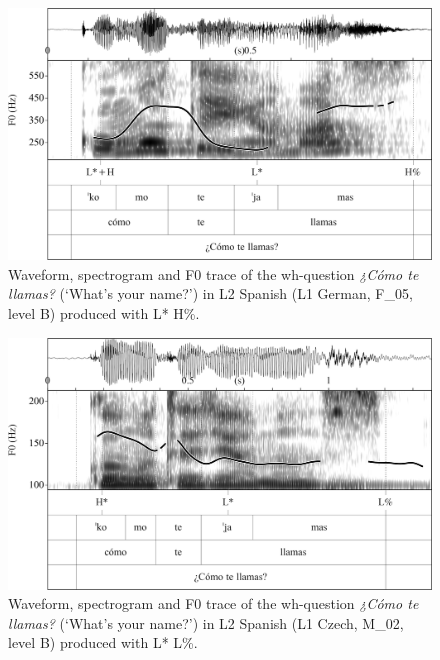 \begin{figure}


\includegraphics[width=\textwidth]{figures/Figure_4.113.png}



\caption{Waveform, spectrogram and F0 trace of the wh-question \textit{¿Cómo te llamas?} (‘What’s your name?’) in L2 Spanish (L1 German, \mbox{F\_05}, level B) produced with L* H\%.}
\label{fig:4.113}
\end{figure}

\begin{figure}


\includegraphics[width=\textwidth]{figures/Figure_4.114.png}



\caption{Waveform, spectrogram and F0 trace of the wh-question \textit{¿Cómo te llamas?} (‘What’s your name?’) in L2 Spanish (L1 Czech, \mbox{M\_02}, level B) produced with L* L\%.}
\label{fig:4.114}
\end{figure}

